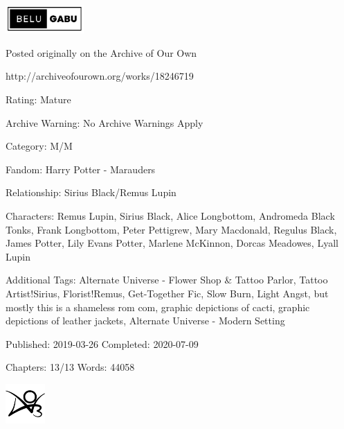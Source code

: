 \documentclass[12pt, a5paper, twoside]{book}
\begin{document}
\begin{center}

\vspace*{3cm}

\includegraphics[width=3cm]{figures/editoring.png}

\vspace*{\fill}

\tiny
Posted originally on the Archive of Our Own

http://archiveofourown.org/works/18246719

Rating: Mature

Archive Warning: No Archive Warnings Apply

Category: M/M

Fandom: Harry Potter - Marauders

Relationship: Sirius Black/Remus Lupin

Characters: Remus Lupin, Sirius Black, Alice Longbottom, Andromeda Black Tonks, Frank Longbottom, Peter Pettigrew, Mary Macdonald, Regulus Black, James Potter, Lily Evans Potter, Marlene McKinnon, Dorcas Meadowes, Lyall Lupin

Additional Tags: Alternate Universe - Flower Shop \& Tattoo Parlor, Tattoo Artist!Sirius, Florist!Remus, Get-Together Fic, Slow Burn, Light Angst, but mostly this is a shameless rom com, graphic depictions of cacti, graphic depictions of leather jackets, Alternate Universe - Modern Setting

Published: 2019-03-26 Completed: 2020-07-09

Chapters: 13/13 Words: 44058

\vspace*{5mm}

\includegraphics[width=1.5cm]{figures/ao3.png}
\end{center}

\newpage
\end{document}
